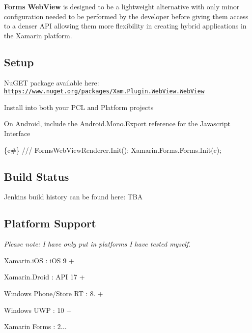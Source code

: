 {\bfseries Forms Web\+View} is designed to be a lightweight alternative with only minor configuration needed to be performed by the developer before giving them access to a denser A\+PI allowing them more flexibility in creating hybrid applications in the Xamarin platform.

\subsection*{Setup}


\begin{DoxyItemize}
\item Nu\+G\+ET package available here\+: \href{https://www.nuget.org/packages/Xam.Plugin.WebView.WebView}{\tt https\+://www.\+nuget.\+org/packages/\+Xam.\+Plugin.\+Web\+View.\+Web\+View}
\item Install into both your P\+CL and Platform projects
\item On Android, include the Android.\+Mono.\+Export reference for the Javascript Interface
\end{DoxyItemize}


\begin{DoxyCode}
\{c#\}
///
FormsWebViewRenderer.Init();
Xamarin.Forms.Forms.Init(e);
\end{DoxyCode}


\subsection*{Build Status}


\begin{DoxyItemize}
\item Jenkins build history can be found here\+: T\+BA
\end{DoxyItemize}

\subsection*{Platform Support}

{\itshape Please note\+: I have only put in platforms I have tested myself.}
\begin{DoxyItemize}
\item Xamarin.\+i\+OS \+: i\+OS 9 +
\item Xamarin.\+Droid \+: A\+PI 17 +
\item Windows Phone/\+Store RT \+: 8. +
\item Windows U\+WP \+: 10 +
\item Xamarin Forms \+: 2...
\end{DoxyItemize}

